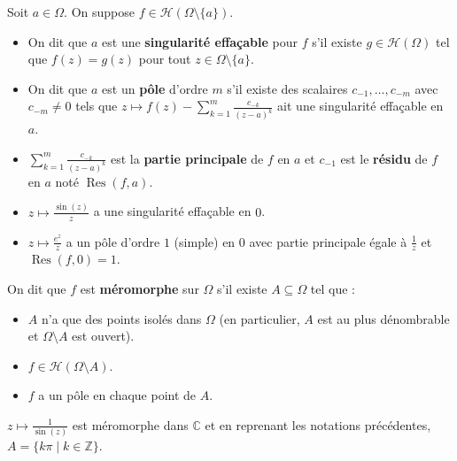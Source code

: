   \begin{definition}
    \label{245-2}
    Soit $a \in \Omega$. On suppose $f \in \mathcal{H}(\Omega \setminus \{ a \})$.
    \begin{itemize}
      \item On dit que $a$ est une \textbf{singularité effaçable} pour $f$ s'il existe $g \in \mathcal{H}(\Omega)$ tel que $f(z) = g(z)$ pour tout $z \in \Omega \setminus \{ a \}$.
      \item On dit que $a$ est un \textbf{pôle} d'ordre $m$ s'il existe des scalaires $c_{-1}, \dots, c_{-m}$ avec $c_{-m} \neq 0$ tels que $z \mapsto f(z) - \sum_{k=1}^m \frac{c_{-k}}{(z-a)^{k}}$ ait une singularité effaçable en $a$.
      \item $\sum_{k=1}^m \frac{c_{-k}}{(z-a)^{k}}$ est la \textbf{partie principale} de $f$ en $a$ et $c_{-1}$ est le \textbf{résidu} de $f$ en $a$ noté $\operatorname{Res}(f,a)$.
    \end{itemize}
  \end{definition}

  \begin{example}
    \begin{itemize}
      \item $z \mapsto \frac{\sin(z)}{z}$ a une singularité effaçable en $0$.
      \item $z \mapsto \frac{e^z}{z}$ a un pôle d'ordre $1$ (simple) en $0$ avec partie principale égale à $\frac{1}{z}$ et $\operatorname{Res}(f, 0) = 1$.
    \end{itemize}
  \end{example}

  \begin{definition}
    On dit que $f$ est \textbf{méromorphe} sur $\Omega$ s'il existe $A \subseteq \Omega$ tel que :
    \begin{itemize}
      \item $A$ n'a que des points isolés dans $\Omega$ (en particulier, $A$ est au plus dénombrable et $\Omega \setminus A$ est ouvert).
      \item $f \in \mathcal{H}(\Omega \setminus A)$.
      \item $f$ a un pôle en chaque point de $A$.
    \end{itemize}
  \end{definition}

  \begin{example}
    $z \mapsto \frac{1}{\sin(z)}$ est méromorphe dans $\mathbb{C}$ et en reprenant les notations précédentes, $A = \{ k\pi \mid k \in \mathbb{Z} \}$.
  \end{example}


